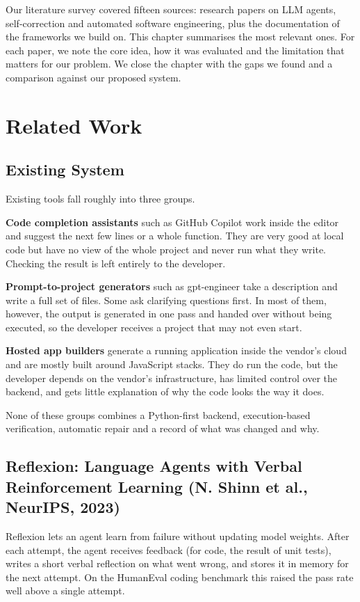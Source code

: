 \documentclass[12pt,a4paper]{report}
\begin{document}
Our literature survey covered fifteen sources: research papers on LLM agents, self-correction and automated software engineering, plus the documentation of the frameworks we build on. This chapter summarises the most relevant ones. For each paper, we note the core idea, how it was evaluated and the limitation that matters for our problem. We close the chapter with the gaps we found and a comparison against our proposed system.

\section{Related Work}
\subsection{Existing System}

Existing tools fall roughly into three groups.

\textbf{Code completion assistants} such as GitHub Copilot \cite{copilot} work inside the editor and suggest the next few lines or a whole function. They are very good at local code but have no view of the whole project and never run what they write. Checking the result is left entirely to the developer.

\textbf{Prompt-to-project generators} such as gpt-engineer \cite{gptengineer} take a description and write a full set of files. Some ask clarifying questions first. In most of them, however, the output is generated in one pass and handed over without being executed, so the developer receives a project that may not even start.

\textbf{Hosted app builders} generate a running application inside the vendor's cloud and are mostly built around JavaScript stacks. They do run the code, but the developer depends on the vendor's infrastructure, has limited control over the backend, and gets little explanation of why the code looks the way it does.

None of these groups combines a Python-first backend, execution-based verification, automatic repair and a record of what was changed and why.

\subsection{Reflexion: Language Agents with Verbal Reinforcement Learning (N. Shinn et al., NeurIPS, 2023)}

Reflexion \cite{shinn2023reflexion} lets an agent learn from failure without updating model weights. After each attempt, the agent receives feedback (for code, the result of unit tests), writes a short verbal reflection on what went wrong, and stores it in memory for the next attempt. On the HumanEval coding benchmark this raised the pass rate well above a single attempt.
\end{document}
